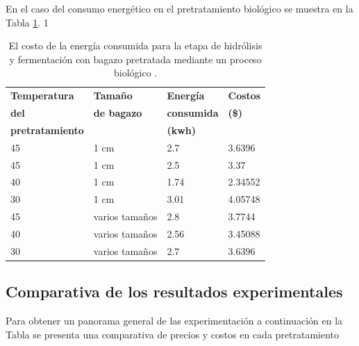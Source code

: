 \documentclass[12pt]{article}
\begin{document}
	En el caso del consumo energético en el pretratamiento biológico se muestra en la Tabla 	\ref{energi_fermentacion en biologico}.
	1
	\begin{table}[H]
		\centering
			\label{energi_fermentacion en biologico}
		\caption{El costo de la energía consumida para la etapa de hidrólisis y fermentación con bagazo pretratada mediante un proceso biológico . }
            {\fontsize{9}{10.8}\selectfont %
		\begin{tabular}{|l|l|l|l|}
				\hline
\textbf{Temperatura} & \textbf{Tamaño } & \textbf{Energía } & \textbf{Costos } \\ 
\textbf{del} &	\textbf{ de bagazo}   & 	\textbf{consumida  }& 	\textbf{(\$)} \\ 
\textbf{pretratamiento}  &    & \textbf{(kwh)} &  \\ \hline
			45 & 1 cm & 2.7 & 3.6396  \\ \hline
			45 & 1 cm & 2.5 & 3.37  \\ \hline
			40 & 1 cm & 1.74 & 2.34552  \\ \hline
			30 & 1 cm & 3.01 & 4.05748  \\ \hline
			45 & varios tamaños & 2.8 & 3.7744  \\ \hline
			40 & varios tamaños & 2.56 & 3.45088  \\ \hline
			30 & varios tamaños & 2.7 & 3.6396  \\ \hline
		\end{tabular}
}
	\end{table}
	
	
		\subsection{Comparativa de los resultados experimentales}
	
	Para obtener un panorama general de las experimentación a continuación en la Tabla se presenta una comparativa de precios y costos en cada pretratamiento
	
\end{document}
